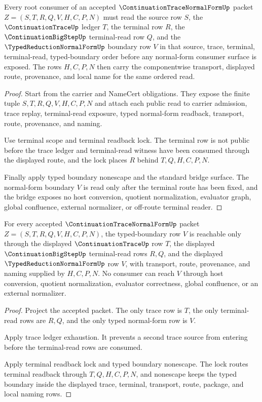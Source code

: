 \begin{theorem}
\label{thm:continuation-trace-normal-form-root-terminal-source-order}
Every root consumer of an accepted $\ContinuationTraceNormalFormUp$ packet $Z=(S,T,R,Q,V,H,C,P,N)$ must read the source row $S$, the $\ContinuationTraceUp$ ledger $T$, the terminal row $R$, the $\ContinuationBigStepUp$ terminal-read row $Q$, and the $\TypedReductionNormalFormUp$ boundary row $V$ in that source, trace, terminal, terminal-read, typed-boundary order before any normal-form consumer surface is exposed. The rows $H,C,P,N$ then carry the componentwise transport, displayed route, provenance, and local name for the same ordered read.
\end{theorem}
\begin{proof}
Start from the carrier and NameCert obligations. They expose the finite tuple $S,T,R,Q,V,H,C,P,N$ and attach each public read to carrier admission, trace replay, terminal-read exposure, typed normal-form readback, transport, route, provenance, and naming.

Use terminal scope and terminal readback lock. The terminal row is not public before the trace ledger and terminal-read witness have been consumed through the displayed route, and the lock places $R$ behind $T,Q,H,C,P,N$.

Finally apply typed boundary nonescape and the standard bridge surface. The normal-form boundary $V$ is read only after the terminal route has been fixed, and the bridge exposes no host conversion, quotient normalization, evaluator graph, global confluence, external normalizer, or off-route terminal reader.
\end{proof}

\begin{theorem}
\label{thm:continuation-trace-normal-form-root-typed-boundary-route}
For every accepted $\ContinuationTraceNormalFormUp$ packet $Z=(S,T,R,Q,V,H,C,P,N)$, the typed-boundary row $V$ is reachable only through the displayed $\ContinuationTraceUp$ row $T$, the displayed $\ContinuationBigStepUp$ terminal-read rows $R,Q$, and the displayed $\TypedReductionNormalFormUp$ row $V$, with transport, route, provenance, and naming supplied by $H,C,P,N$. No consumer can reach $V$ through host conversion, quotient normalization, evaluator correctness, global confluence, or an external normalizer.
\end{theorem}
\begin{proof}
Project the accepted packet. The only trace row is $T$, the only terminal-read rows are $R,Q$, and the only typed normal-form row is $V$.

Apply trace ledger exhaustion. It prevents a second trace source from entering before the terminal-read rows are consumed.

Apply terminal readback lock and typed boundary nonescape. The lock routes terminal readback through $T,Q,H,C,P,N$, and nonescape keeps the typed boundary inside the displayed trace, terminal, transport, route, package, and local naming rows.
\end{proof}

